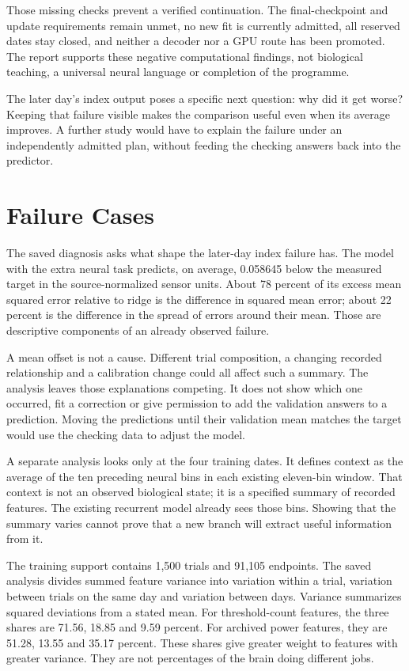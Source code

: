 Those missing checks prevent a verified continuation. The final-checkpoint and
update requirements remain unmet, no new fit is currently admitted, all reserved
dates stay closed, and neither a decoder nor a GPU route has been promoted.
The report supports these negative computational findings, not biological
teaching, a universal neural language or completion of the programme.

\begingroup
{}
The later day's index output poses a specific next question: why did it get
worse? Keeping that failure visible makes the comparison useful even when its
average improves. A further study would have to explain the failure under an
independently admitted plan, without feeding the checking answers back into
the predictor.
\par
\endgroup

\section{Failure Cases}

The saved diagnosis asks what shape the later-day index failure has. The model
with the extra neural task predicts, on average, 0.058645 below the measured
target in the source-normalized sensor units. About 78 percent of its excess
mean squared error relative to ridge is the difference in squared mean error;
about 22 percent is the difference in the spread of errors around their mean.
Those are descriptive components of an already observed failure.

A mean offset is not a cause. Different trial composition, a changing recorded
relationship and a calibration change could all affect such a summary. The
analysis leaves those explanations competing. It does not show which one
occurred, fit a correction or give permission to add the validation answers
to a prediction. Moving the predictions until their validation mean matches
the target would use the checking data to adjust the model.

A separate analysis looks only at the four training dates. It defines context
as the average of the ten preceding neural bins in each existing eleven-bin
window. That context is not an observed biological state; it is a specified
summary of recorded features. The existing recurrent model already sees those
bins. Showing that the summary varies cannot prove that a new branch will
extract useful information from it.

The training support contains 1,500 trials and 91,105 endpoints. The saved
analysis divides summed feature variance into variation within a trial,
variation between trials on the same day and variation between days. Variance
summarizes squared deviations from a stated mean. For threshold-count features,
the three shares are 71.56, 18.85 and 9.59 percent. For archived power features,
they are 51.28, 13.55 and 35.17 percent. These shares give greater weight to
features with greater variance. They are not percentages of the brain doing
different jobs.

